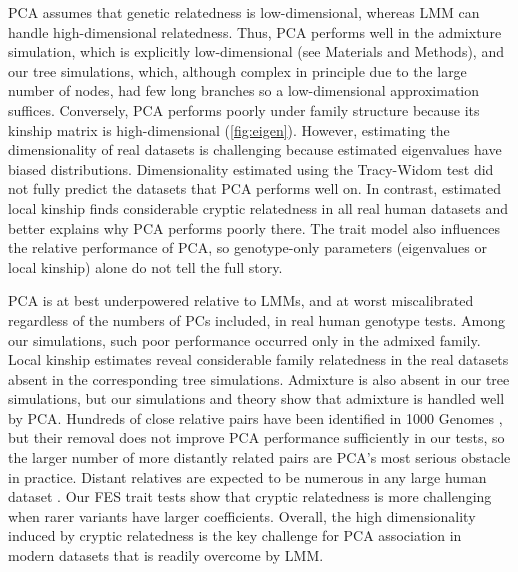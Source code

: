 \documentclass[11pt]{article}
\begin{document}
\begin{linenumbers}
PCA assumes that genetic relatedness is low-dimensional, whereas LMM can handle high-dimensional relatedness.
Thus, PCA performs well in the admixture simulation, which is explicitly low-dimensional (see Materials and Methods), and our tree simulations, which, although complex in principle due to the large number of nodes, had few long branches so a low-dimensional approximation suffices.
Conversely, PCA performs poorly under family structure because its kinship matrix is high-dimensional (\cref{fig:eigen}).
However, estimating the dimensionality of real datasets is challenging because estimated eigenvalues have biased distributions.
Dimensionality estimated using the Tracy-Widom test \citep{patterson_population_2006} did not fully predict the datasets that PCA performs well on.
In contrast, estimated local kinship finds considerable cryptic relatedness in all real human datasets and better explains why PCA performs poorly there.
The trait model also influences the relative performance of PCA, so genotype-only parameters (eigenvalues or local kinship) alone do not tell the full story.

PCA is at best underpowered relative to LMMs, and at worst miscalibrated regardless of the numbers of PCs included, in real human genotype tests.
Among our simulations, such poor performance occurred only in the admixed family.
Local kinship estimates reveal considerable family relatedness in the real datasets absent in the corresponding tree simulations.
Admixture is also absent in our tree simulations, but our simulations and theory show that admixture is handled well by PCA.
Hundreds of close relative pairs have been identified in 1000 Genomes \citep{gazal_high_2015, al-khudhair_inference_2015, fedorova_atlas_2016, schlauch_identification_2017}, but their removal does not improve PCA performance sufficiently in our tests, so the larger number of more distantly related pairs are PCA's most serious obstacle in practice.
Distant relatives are expected to be numerous in any large human dataset \citep{henn_cryptic_2012, shchur_number_2018}.
Our FES trait tests show that cryptic relatedness is more challenging when rarer variants have larger coefficients.
Overall, the high dimensionality induced by cryptic relatedness is the key challenge for PCA association in modern datasets that is readily overcome by LMM.


\end{linenumbers}
\end{document}

